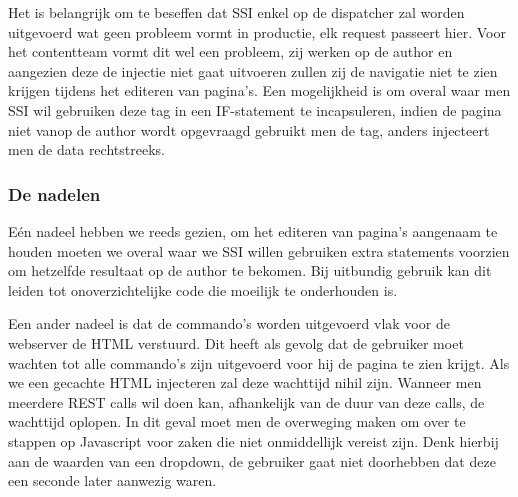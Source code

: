     \par
    Het is belangrijk om te beseffen dat SSI enkel op de dispatcher zal worden uitgevoerd wat geen probleem vormt in productie, elk request passeert hier. Voor het contentteam vormt dit wel een probleem, zij werken op de author en aangezien deze de injectie niet gaat uitvoeren zullen zij de navigatie niet te zien krijgen tijdens het editeren van pagina's. Een mogelijkheid is om overal waar men SSI wil gebruiken deze tag in een IF-statement te incapsuleren, indien de pagina niet vanop de author wordt opgevraagd gebruikt men de tag, anders injecteert men de data rechtstreeks.
	\subsubsection{De nadelen}
    E\'en nadeel hebben we reeds gezien, om het editeren van pagina's aangenaam te houden moeten we overal waar we SSI willen gebruiken extra statements voorzien om hetzelfde resultaat op de author te bekomen. Bij uitbundig gebruik kan dit leiden tot onoverzichtelijke code die moeilijk te onderhouden is.
    \par
    Een ander nadeel is dat de commando's worden uitgevoerd vlak voor de webserver de HTML verstuurd. Dit heeft als gevolg dat de gebruiker moet wachten tot alle commando's zijn uitgevoerd voor hij de pagina te zien krijgt. Als we een gecachte HTML injecteren zal deze wachttijd nihil zijn. Wanneer men meerdere REST calls wil doen kan, afhankelijk van de duur van deze calls, de wachttijd oplopen. In dit geval moet men de overweging maken om over te stappen op Javascript voor zaken die niet onmiddellijk vereist zijn. Denk hierbij aan de waarden van een dropdown, de gebruiker gaat niet doorhebben dat deze een seconde later aanwezig waren. 
